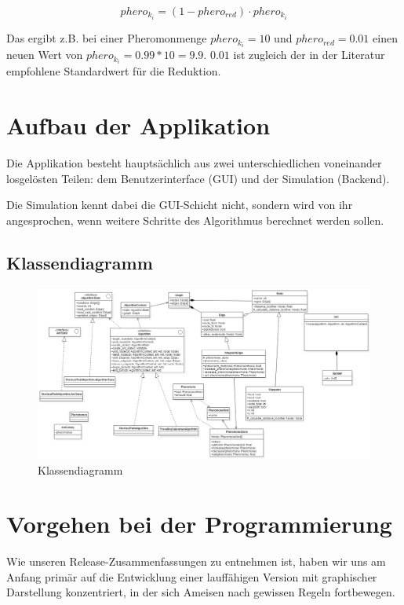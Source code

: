 \[ phero_{k_i} = (1 - phero_{red}) \cdot phero_{k_i} \]

Das ergibt z.B. bei einer Pheromonmenge $phero_{k_i} = 10$ und $phero_{red} = 0.01$ einen neuen Wert von $phero_{k_i} = 0.99 * 10 = 9.9$. $0.01$ ist zugleich der in der Literatur empfohlene Standardwert für die Reduktion.

\section{Aufbau der Applikation}

Die Applikation besteht hauptsächlich aus zwei unterschiedlichen voneinander losgelösten Teilen: dem Benutzerinterface (GUI) und der Simulation (Backend).

Die Simulation kennt dabei die GUI-Schicht nicht, sondern wird von ihr angesprochen, wenn weitere Schritte des Algorithmus berechnet werden sollen.

\pagebreak
\subsection{Klassendiagramm}

\begin{figure}
    \centering
    \includegraphics[width=\textheight]{images/class_diagram.png}     
    \caption{Klassendiagramm}
\end{figure}

\section{Vorgehen bei der Programmierung}

Wie unseren Release-Zusammenfassungen zu entnehmen ist, haben wir uns am Anfang primär auf die Entwicklung einer lauffähigen Version mit graphischer Darstellung konzentriert, in der sich Ameisen nach gewissen Regeln fortbewegen. 

